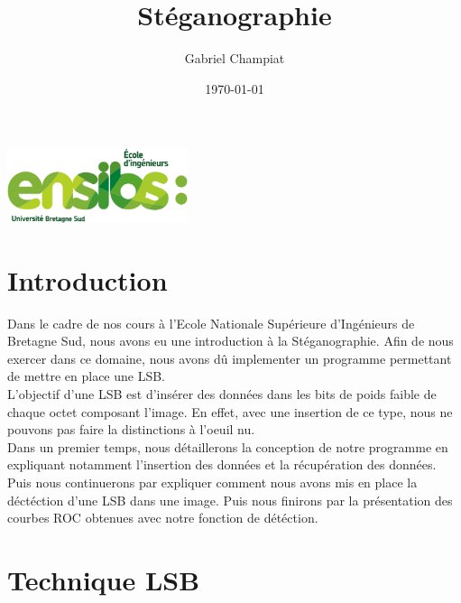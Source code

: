 \documentclass[letterpaper,12pt, french]{article}
\author{ Gabriel Champiat}
\date{\today}
\title{Stéganographie}
\begin{document}
\maketitle
\begin{center}
        \includegraphics[width=200px]{./images/logo.png}
\end{center}
\pagebreak

\tableofcontents
\pagebreak

\section{Introduction}
\label{sec:orgc28a7fa}
\noindent
Dans le cadre de nos cours à l'Ecole Nationale Supérieure d'Ingénieurs de Bretagne Sud, nous
avons eu une introduction à la Stéganographie. Afin de nous exercer dans ce domaine, nous avons
dû implementer un programme permettant de mettre en place une LSB. 
\vspace{1\baselineskip}
\\
L'objectif d'une LSB est d'insérer des données dans les bits de poids faible de chaque octet composant
l'image. En effet, avec une insertion de ce type, nous ne pouvons pas faire la distinctions à l'oeuil
nu.
\vspace{1\baselineskip}
\\
Dans un premier temps, nous détaillerons la conception de notre programme en expliquant notamment l'insertion
des données et la récupération des données. Puis nous continuerons par expliquer comment nous avons mis
en place la déctéction d'une LSB dans une image. Puis nous finirons par la présentation des courbes ROC
obtenues avec notre fonction de détéction.

\pagebreak

\section{Technique LSB}
\label{sec:orgb7dc5ee}
\end{document}
